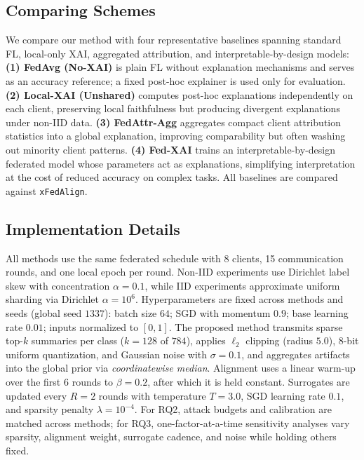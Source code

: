 \documentclass{article}
\theoremstyle{plain}
\theoremstyle{definition}
\theoremstyle{remark}
\begin{document}
\subsection{Comparing Schemes}
We compare our method with four representative baselines spanning standard FL, local-only XAI, aggregated attribution, and interpretable-by-design models:
\textbf{(1) FedAvg (No-XAI)} is plain FL without explanation mechanisms and serves as an accuracy reference; a fixed post-hoc explainer is used only for evaluation.
\textbf{(2) Local-XAI (Unshared)} \cite{sundararajan2017axiomatic} computes post-hoc explanations independently on each client, preserving local faithfulness but producing divergent explanations under non-IID data.
\textbf{(3) FedAttr-Agg} \cite{wang2021federated} aggregates compact client attribution statistics into a global explanation, improving comparability but often washing out minority client patterns.
\textbf{(4) Fed-XAI} \cite{barcena2022fed} trains an interpretable-by-design federated model whose parameters act as explanations, simplifying interpretation at the cost of reduced accuracy on complex tasks.
All baselines are compared against \texttt{xFedAlign}.

\subsection{Implementation Details}
All methods use the same federated schedule with 8 clients, 15 communication rounds, and one local epoch per round. Non-IID experiments use Dirichlet label skew with concentration $\alpha=0.1$, while IID experiments approximate uniform sharding via Dirichlet $\alpha=10^{6}$. Hyperparameters are fixed across methods and seeds (global seed $1337$): batch size $64$; SGD with momentum $0.9$; base learning rate $0.01$; inputs normalized to $[0,1]$. The proposed method transmits sparse top-$k$ summaries per class ($k=128$ of $784$), applies $\ell_2$ clipping (radius $5.0$), $8$-bit uniform quantization, and Gaussian noise with $\sigma=0.1$, and aggregates artifacts into the global prior via \textit{coordinatewise median}. Alignment uses a linear warm-up over the first 6 rounds to $\beta=0.2$, after which it is held constant. Surrogates are updated every $R=2$ rounds with temperature $T=3.0$, SGD learning rate $0.1$, and sparsity penalty $\lambda=10^{-4}$. For RQ2, attack budgets and calibration are matched across methods; for RQ3, one-factor-at-a-time sensitivity analyses vary sparsity, alignment weight, surrogate cadence, and noise while holding others fixed.
\end{document}
